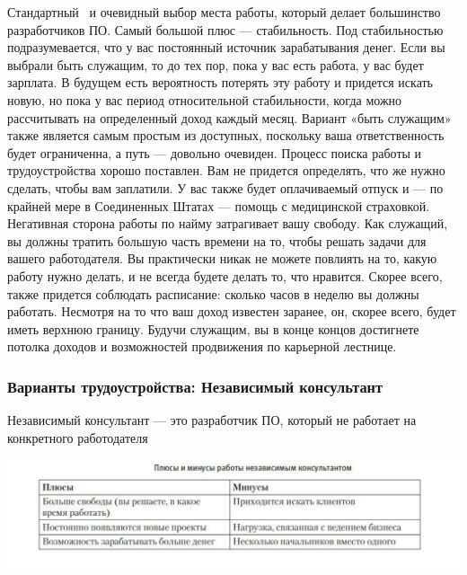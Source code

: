 \documentclass{../industrial-development}
\begin{document}
\lecturenotes
Стандартный~\cite[с.~62--67]{Sonmez} и очевидный выбор места работы, который делает большинство разработчиков ПО. 
Самый большой плюс — стабильность. Под стабильностью подразумевается, что у вас постоянный источник зарабатывания денег. Если вы выбрали быть служащим, то до тех пор, пока у вас есть работа, у вас будет зарплата. В будущем есть вероятность  потерять эту работу и придется искать новую, но пока у вас период относительной стабильности, когда можно рассчитывать на определенный доход каждый месяц.
Вариант «быть служащим» также является самым простым из доступных, поскольку ваша ответственность будет ограниченна, а путь — довольно очевиден. Процесс поиска работы и трудоустройства хорошо поставлен. Вам не придется определять, что же нужно сделать, чтобы вам заплатили. У вас также будет оплачиваемый отпуск и — по крайней мере в Соединенных Штатах — помощь с медицинской страховкой.
Негативная сторона работы по найму затрагивает вашу свободу. Как служащий, вы должны тратить большую часть времени на то, чтобы решать задачи для вашего работодателя. Вы практически никак не можете повлиять на то, какую работу нужно делать, и не всегда будете делать то, что нравится. Скорее всего, также придется соблюдать расписание: сколько часов в неделю вы должны работать.
Несмотря на то что ваш доход известен заранее, он, скорее всего, будет иметь верхнюю границу. Будучи служащим, вы в конце концов достигнете потолка доходов и возможностей продвижения по карьерной лестнице.


\begin{frame} \frametitle{Варианты трудоустройства: Независимый консультант}
  \begin{block}{}
    Независимый консультант --- это разработчик ПО, который не работает на конкретного работодателя 
  \end{block}
  
    \centerline{\includegraphics[height=0.38\textheight]{11-IT-specialist's-way/fl.pdf}}
\end{frame}
\end{document}
